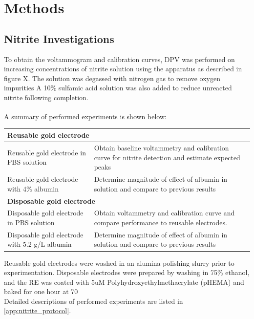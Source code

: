 \section{Methods}
\vspace{-0.5cm}
\subsection{Nitrite Investigations}
\vspace{-0.5cm}
To obtain the voltammogram and calibration curves, DPV was performed on increasing concentrations of nitrite solution using the apparatus as described in figure X. The solution was degassed with nitrogen gas to remove oxygen impurities A 10$\%$ sulfamic acid solution was also added to reduce unreacted nitrite following completion.\\\\
A summary of performed experiments is shown below:

\begin{table}[H]
    \centering
    \begin{tabular}{ |p{3.7cm}||p{3.7cm}| } 
        \hline
        \multicolumn{2}{|l|}{\textbf{Reusable gold electrode}} \\ \hline
        Reusable gold electrode in PBS solution & Obtain baseline voltammetry and calibration curve for nitrite detection and estimate expected peaks\\ \hline
        Reusable gold electrode with 4\% albumin & Determine magnitude of effect of albumin in solution and compare to previous results \\ \hline
        \multicolumn{2}{|l|}{\textbf{Disposable gold electrode}} \\ \hline
    Disposable gold electrode in PBS solution & Obtain voltammetry and calibration curve and compare performance to reusable electrodes. \\ \hline
    Disposable gold electrode with 5.2 g/L albumin & Determine magnitude of effect of albumin in solution and compare to previous results\\ \hline
    \end{tabular}
    \label{tab:my_label}
\end{table}
Reusable gold electrodes were washed in an alumina polishing slurry prior to experimentation. Disposable electrodes were prepared by washing in 75\% ethanol, and the RE was coated with 5uM Polyhydroxyethylmethacrylate (pHEMA) and baked for one hour at 70 \\
Detailed descriptions of performed experiments are listed in \autoref{app:nitrite_protocol}.


